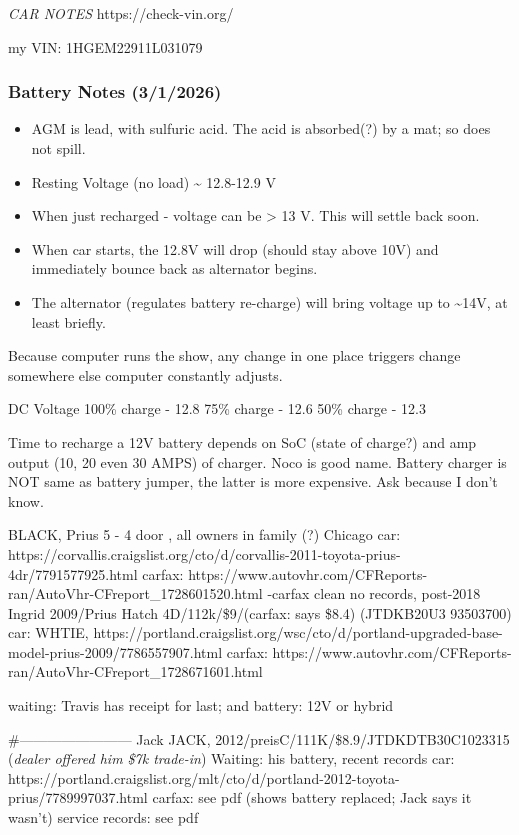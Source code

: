 \documentclass[
  letterpaper,
  DIV=11,
  numbers=noendperiod]{scrartcl}
\providecommand{\tightlist}{%
  \setlength{\itemsep}{0pt}\setlength{\parskip}{0pt}}\usepackage{longtable,booktabs,array}
\begin{document}
\emph{CAR NOTES} https://check-vin.org/

my VIN: 1HGEM22911L031079

\subsubsection{Battery Notes (3/1/2026)}\label{battery-notes-312026}

\begin{itemize}
\tightlist
\item
  AGM is lead, with sulfuric acid. The acid is absorbed(?) by a mat; so
  does not spill.
\item
  Resting Voltage (no load) \textasciitilde{} 12.8-12.9 V
\item
  When just recharged - voltage can be \textgreater{} 13 V. This will
  settle back soon.
\item
  When car starts, the 12.8V will drop (should stay above 10V) and
  immediately bounce back as alternator begins.
\item
  The alternator (regulates battery re-charge) will bring voltage up to
  \textasciitilde14V, at least briefly.
\end{itemize}

Because computer runs the show, any change in one place triggers change
somewhere else computer constantly adjusts.

DC Voltage 100\% charge - 12.8 75\% charge - 12.6 50\% charge - 12.3

Time to recharge a 12V battery depends on SoC (state of charge?) and amp
output (10, 20 even 30 AMPS) of charger. Noco is good name. Battery
charger is NOT same as battery jumper, the latter is more expensive. Ask
because I don't know.

BLACK, Prius 5 - 4 door , all owners in family (?) Chicago car:
https://corvallis.craigslist.org/cto/d/corvallis-2011-toyota-prius-4dr/7791577925.html
carfax:
https://www.autovhr.com/CFReports-ran/AutoVhr-CFreport\_1728601520.html
-carfax clean no records, post-2018 Ingrid 2009/Prius Hatch
4D/112k/\$9/(carfax: says \$8.4) (JTDKB20U3 93503700) car: WHTIE,
https://portland.craigslist.org/wsc/cto/d/portland-upgraded-base-model-prius-2009/7786557907.html
carfax:
https://www.autovhr.com/CFReports-ran/AutoVhr-CFreport\_1728671601.html

waiting: Travis has receipt for last; and battery: 12V or hybrid

\#------------------------ Jack JACK,
2012/preisC/111K/\$8.9/JTDKDTB30C1023315 (\emph{dealer offered him \$7k
trade-in}) Waiting: his battery, recent records car:
https://portland.craigslist.org/mlt/cto/d/portland-2012-toyota-prius/7789997037.html
carfax: see pdf (shows battery replaced; Jack says it wasn't) service
records: see pdf
\end{document}
